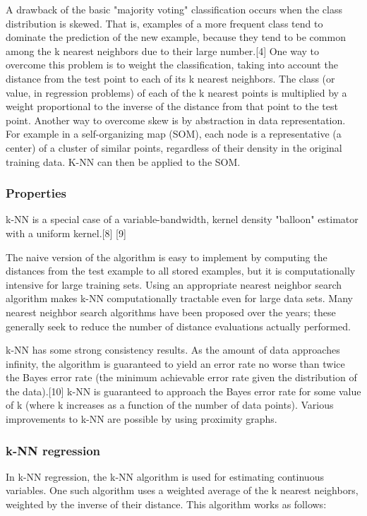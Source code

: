 \documentclass[12pt]{book}
\begin{document}
A drawback of the basic "majority voting" classification occurs when the class distribution is skewed. That is, examples of a more frequent class tend to dominate the prediction of the new example, because they tend to be common among the k nearest neighbors due to their large number.[4] One way to overcome this problem is to weight the classification, taking into account the distance from the test point to each of its k nearest neighbors. The class (or value, in regression problems) of each of the k nearest points is multiplied by a weight proportional to the inverse of the distance from that point to the test point. Another way to overcome skew is by abstraction in data representation. For example in a self-organizing map (SOM), each node is a representative (a center) of a cluster of similar points, regardless of their density in the original training data. K-NN can then be applied to the SOM.

\subsubsection{Properties}
k-NN is a special case of a variable-bandwidth, kernel density "balloon" estimator with a uniform kernel.[8] [9]

The naive version of the algorithm is easy to implement by computing the distances from the test example to all stored examples, but it is computationally intensive for large training sets. Using an appropriate nearest neighbor search algorithm makes k-NN computationally tractable even for large data sets. Many nearest neighbor search algorithms have been proposed over the years; these generally seek to reduce the number of distance evaluations actually performed.

k-NN has some strong consistency results. As the amount of data approaches infinity, the algorithm is guaranteed to yield an error rate no worse than twice the Bayes error rate (the minimum achievable error rate given the distribution of the data).[10] k-NN is guaranteed to approach the Bayes error rate for some value of k (where k increases as a function of the number of data points). Various improvements to k-NN are possible by using proximity graphs.

\subsubsection{k-NN regression}
In k-NN regression, the k-NN algorithm is used for estimating continuous variables. One such algorithm uses a weighted average of the k nearest neighbors, weighted by the inverse of their distance. This algorithm works as follows:
\end{document}

